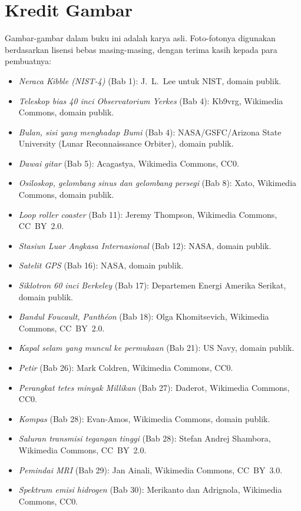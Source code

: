 \chapter*{Kredit Gambar}

Gambar-gambar dalam buku ini adalah karya asli. Foto-fotonya digunakan
berdasarkan lisensi bebas masing-masing, dengan terima kasih kepada para
pembuatnya:

\begin{itemize}
  \item \emph{Neraca Kibble (NIST-4)} (Bab 1): J.~L.~Lee untuk NIST,
        domain publik.
  \item \emph{Teleskop bias 40 inci Observatorium Yerkes} (Bab 4):
        Kb9vrg, Wikimedia Commons, domain publik.
  \item \emph{Bulan, sisi yang menghadap Bumi} (Bab 4):
        NASA/GSFC/Arizona State University (Lunar Reconnaissance
        Orbiter), domain publik.
  \item \emph{Dawai gitar} (Bab 5): Acagastya, Wikimedia Commons,
        CC0.
  \item \emph{Osiloskop, gelombang sinus dan gelombang persegi}
        (Bab 8): Xato, Wikimedia Commons, domain publik.
  \item \emph{Loop roller coaster} (Bab 11): Jeremy Thompson,
        Wikimedia Commons, CC~BY~2.0.
  \item \emph{Stasiun Luar Angkasa Internasional} (Bab 12): NASA,
        domain publik.
  \item \emph{Satelit GPS} (Bab 16): NASA, domain publik.
  \item \emph{Siklotron 60 inci Berkeley} (Bab 17): Departemen Energi
        Amerika Serikat, domain publik.
  \item \emph{Bandul Foucault, Panthéon} (Bab 18): Olga Khomitsevich,
        Wikimedia Commons, CC~BY~2.0.
  \item \emph{Kapal selam yang muncul ke permukaan} (Bab 21): US
        Navy, domain publik.
  \item \emph{Petir} (Bab 26): Mark Coldren, Wikimedia Commons, CC0.
  \item \emph{Perangkat tetes minyak Millikan} (Bab 27): Daderot,
        Wikimedia Commons, CC0.
  \item \emph{Kompas} (Bab 28): Evan-Amos, Wikimedia Commons, domain
        publik.
  \item \emph{Saluran transmisi tegangan tinggi} (Bab 28): Stefan
        Andrej Shambora, Wikimedia Commons, CC~BY~2.0.
  \item \emph{Pemindai MRI} (Bab 29): Jan Ainali, Wikimedia Commons,
        CC~BY~3.0.
  \item \emph{Spektrum emisi hidrogen} (Bab 30): Merikanto dan
        Adrignola, Wikimedia Commons, CC0.
\end{itemize}

